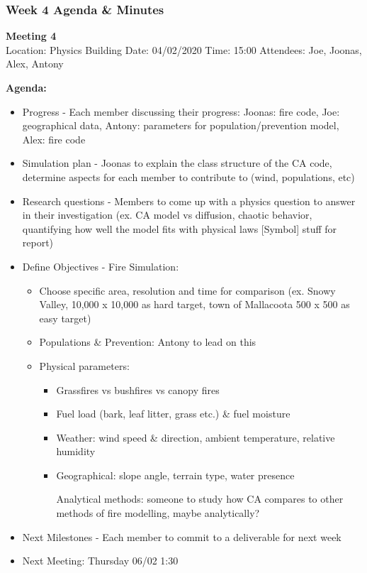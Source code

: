 \subsubsection*{Week 4 Agenda \& Minutes}
\noindent \textbf{Meeting 4}\\
Location: Physics Building\newline
Date: 04/02/2020\newline
Time: 15:00\newline
Attendees: Joe, Joonas, Alex, Antony

\noindent \textbf{Agenda:}
\begin{itemize}
	\item Progress - Each member discussing their progress: Joonas: fire code, Joe: geographical data, Antony: parameters for population/prevention model, Alex: fire code  
	\item Simulation plan - Joonas to explain the class structure of the CA code, determine aspects for each member to contribute to (wind, populations, etc) 
	\item Research questions - Members to come up with a physics question to answer in their investigation (ex. CA model vs diffusion, chaotic behavior, quantifying how well the model fits with physical laws [Symbol] stuff for report) 
	\item Define Objectives - Fire Simulation: \begin{itemize}
		\item Choose specific area, resolution and time for comparison (ex. Snowy Valley, 10,000 x 10,000 as hard target, town of Mallacoota 500 x 500 as easy target) 
		\item Populations \& Prevention: Antony to lead on this
		
		\item Physical parameters: 
		\begin{itemize}
			\item Grassfires vs bushfires vs canopy fires 
			\item Fuel load (bark, leaf litter, grass etc.) \& fuel moisture 
			\item Weather: wind speed \& direction, ambient temperature, relative humidity 
			\item Geographical: slope angle, terrain type, water presence 
			
			Analytical methods: someone to study how CA compares to other methods of fire modelling, maybe analytically?
		\end{itemize}
	\end{itemize}
	\item Next Milestones - Each member to commit to a deliverable for next week 
	\item Next Meeting: Thursday 06/02 1:30
\end{itemize}

